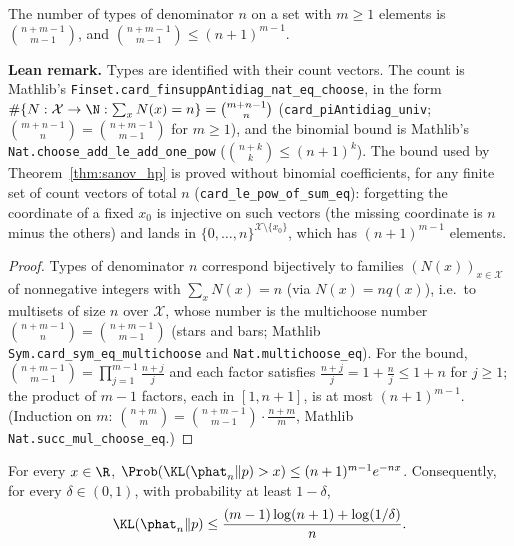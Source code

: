 \begin{lemma}\label{lem:num_types}
\leanok
The number of types of denominator $n$ on a set with $m \ge 1$ elements is
$\binom{n + m - 1}{m - 1}$, and $\binom{n + m - 1}{m - 1} \le (n + 1)^{m - 1}$.
\end{lemma}

\textbf{Lean remark.} Types are identified with their count vectors. The count is Mathlib's
\texttt{Finset.card\_finsuppAntidiag\_nat\_eq\_choose}, in the form
$\#\{N : \mathcal X \to \N : \sum_x N(x) = n\} = \binom{m + n - 1}{n}$ (\texttt{card\_piAntidiag\_univ};
$\binom{m + n - 1}{n} = \binom{n + m - 1}{m - 1}$ for $m \ge 1$), and the binomial bound is Mathlib's
\texttt{Nat.choose\_add\_le\_add\_one\_pow} ($\binom{n + k}{k} \le (n + 1)^k$). The bound used by
Theorem~\ref{thm:sanov_hp} is proved without binomial coefficients, for any finite set of count
vectors of total $n$ (\texttt{card\_le\_pow\_of\_sum\_eq}): forgetting the coordinate of a fixed
$x_0$ is injective on such vectors (the missing coordinate is $n$ minus the others) and lands in
$\{0, \dots, n\}^{\mathcal X \setminus \{x_0\}}$, which has $(n + 1)^{m - 1}$ elements.

\begin{proof}
\leanok
Types of denominator $n$ correspond bijectively to families $(N(x))_{x \in \mathcal X}$ of
nonnegative integers with $\sum_x N(x) = n$ (via $N(x) = n q(x)$), i.e.\ to multisets of size
$n$ over $\mathcal X$, whose number is the multichoose number $\binom{n + m - 1}{n} = \binom{n + m - 1}{m - 1}$
(stars and bars; Mathlib \texttt{Sym.card\_sym\_eq\_multichoose} and
\texttt{Nat.multichoose\_eq}). For the bound, $\binom{n + m - 1}{m - 1} = \prod_{j = 1}^{m - 1} \frac{n + j}{j}$
and each factor satisfies $\frac{n + j}{j} = 1 + \frac nj \le 1 + n$ for $j \ge 1$; the product of
$m - 1$ factors, each in $[1, n + 1]$, is at most $(n + 1)^{m - 1}$. (Induction on $m$:
$\binom{n + m}{m} = \binom{n + m - 1}{m - 1} \cdot \frac{n + m}{m}$, Mathlib
\texttt{Nat.succ\_mul\_choose\_eq}.)
\end{proof}

\begin{theorem}\label{thm:sanov_hp}
\leanok
For every $x \in \R$, $\Prob(\KL(\phat_n \| p) > x) \le (n + 1)^{m - 1} e^{-n x}$. Consequently,
for every $\delta \in (0, 1)$, with probability at least $1 - \delta$,
\[
  \KL(\phat_n \| p) \le \frac{(m - 1)\log(n + 1) + \log(1/\delta)}{n} .
\]
\end{theorem}

